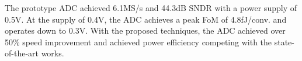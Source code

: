 The prototype ADC achieved 6.1MS/s and 44.3dB SNDR with a power supply of 0.5V. 
At the supply of 0.4V, the ADC achieves a peak FoM of 4.8fJ/conv. and operates down to 0.3V. With the proposed techniques, the ADC achieved over 50\% speed improvement and achieved power efficiency competing with the state-of-the-art works.
